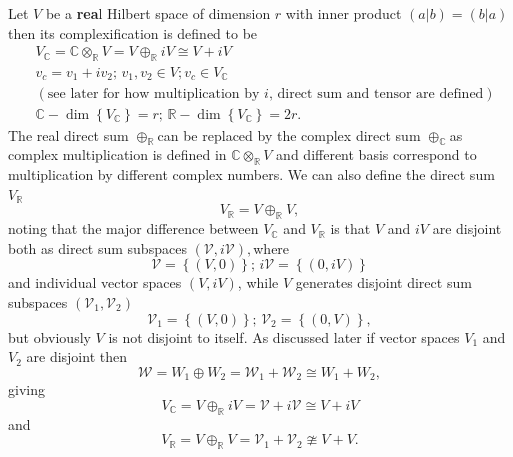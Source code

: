 \documentclass[aps,preprint]{revtex4}
\begin{document}
Let $V$ be a \textbf{rea}l Hilbert space of dimension $r$ with inner product 
$\left( \left. a\right\vert b\right) =\left( \left. b\right\vert a\right) $
then its complexification is defined to be 
\begin{align}
& V_{\mathbb{C}}=\mathbb{C}\otimes _{\mathbb{R}}V=V\oplus _{\mathbb{R}%
}iV\cong V+iV \\
& v_{c}=v_{1}+iv_{2};\,v_{1},v_{2}\in V;v_{c}\in V_{\mathbb{C}} \\
& \left( \text{see later for how multiplication by }i\text{, direct sum and
tensor are defined}\right) \\
& \mathbb{C-}\dim \left\{ V_{\mathbb{C}}\right\} =r;\,\mathbb{R-}\dim
\left\{ V_{\mathbb{C}}\right\} =2r.
\end{align}%
The real direct sum $\oplus _{\mathbb{R}}$can be replaced by the complex
direct sum $\oplus _{\mathbb{C}}$as complex multiplication is defined in $%
\mathbb{C}\otimes _{\mathbb{R}}V$ and different basis correspond to
multiplication by different complex numbers. We can also define the direct
sum $V_{\mathbb{R}}$ 
\begin{equation}
V_{\mathbb{R}}=V\oplus _{\mathbb{R}}V,
\end{equation}%
noting that the major difference between $V_{\mathbb{C}}$ and $V_{\mathbb{R}%
} $ is that $V$ and $iV$ are disjoint both as direct sum subspaces $\left( 
\mathcal{V},i\mathcal{V}\right) ,$where 
\begin{equation}
\mathcal{V}=\left\{ \left( V,0\right) \right\} ;\,i\mathcal{V}=\left\{
\left( 0,iV\right) \right\}
\end{equation}%
and individual vector spaces $\left( V,iV\right) $, while $V$ generates
disjoint direct sum subspaces $\left( \mathcal{V}_{1},\mathcal{V}_{2}\right) 
$ 
\begin{equation}
\mathcal{V}_{1}=\left\{ \left( V,0\right) \right\} ;\,\mathcal{V}%
_{2}=\left\{ \left( 0,V\right) \right\} ,
\end{equation}%
but obviously $V$ is not disjoint to itself. As discussed later if vector
spaces $V_{1}$ and $V_{2}$ are disjoint then 
\begin{equation}
\mathcal{W}=W_{1}\oplus W_{2}=\mathcal{W}_{1}+\mathcal{W}_{2}\cong
W_{1}+W_{2},
\end{equation}%
giving 
\begin{equation}
V_{\mathbb{C}}=V\oplus _{\mathbb{R}}iV=\mathcal{V}+i\mathcal{V}\cong V+iV
\end{equation}%
and 
\begin{equation}
V_{\mathbb{R}}=V\oplus _{\mathbb{R}}V=\mathcal{V}_{1}+\mathcal{V}_{2}\ncong
V+V.
\end{equation}
\end{document}

